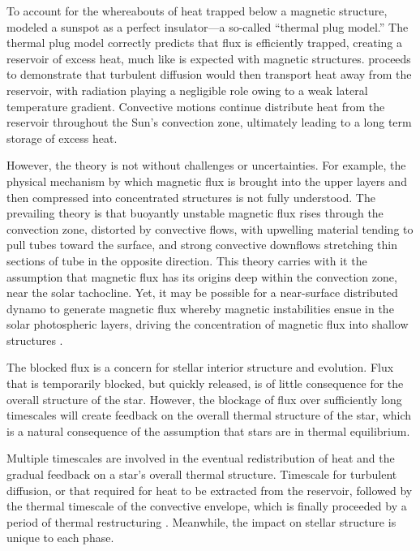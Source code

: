 To account for the whereabouts of heat trapped below a magnetic structure, \citet{Spruit1977} modeled a sunspot as a perfect insulator---a so-called ``thermal plug model.'' The thermal plug model correctly predicts that flux is efficiently trapped, creating a reservoir of excess heat, much like is expected with magnetic structures. \citet{Spruit1977} proceeds to demonstrate that turbulent diffusion would then transport heat away from the reservoir, with radiation playing a negligible role owing to a weak lateral temperature gradient. Convective motions continue distribute heat from the reservoir throughout the Sun's convection zone, ultimately leading to a long term storage of excess heat.

However, the theory is not without challenges or uncertainties. For example, the physical mechanism by which magnetic flux is brought into the upper layers and then compressed into concentrated structures is not fully understood. The prevailing theory is that buoyantly unstable magnetic flux rises through the convection zone, distorted by convective flows, with upwelling material tending to pull tubes toward the surface, and strong convective downflows stretching thin sections of tube in the opposite direction. This theory carries with it the assumption that magnetic flux has its origins deep within the convection zone, near the solar tachocline. Yet, it may be possible for a near-surface distributed dynamo to generate magnetic flux \citep{Brandenburg2005b} whereby magnetic instabilities ensue in the solar photospheric layers, driving the concentration of magnetic flux into shallow structures \citep[the so-called negative effective magnetic pressure instability][]{Brandenburg2011}.

The blocked flux is a concern for stellar interior structure and evolution. Flux that is temporarily blocked, but quickly released, is of little consequence for the overall structure of the star. However, the blockage of flux over sufficiently long timescales will create feedback on the overall thermal structure of the star, which is a natural consequence of the assumption that stars are in thermal equilibrium. 

Multiple timescales are involved in the eventual redistribution of heat and the gradual feedback on a star's overall thermal structure. Timescale for turbulent diffusion, or that required for heat to be extracted from the reservoir, followed by the thermal timescale of the convective envelope, which is finally proceeded by a period of thermal restructuring \citep{Spruit1982a}. Meanwhile, the impact on stellar structure is unique to each phase.

